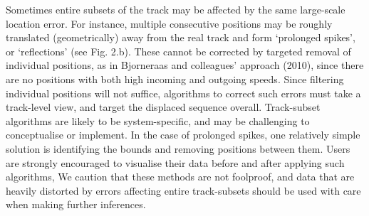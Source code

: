 \documentclass[10pt,paper=a4,headings=standardclasses
]{scrartcl}
\begin{document}
Sometimes entire subsets of the track may be affected by the same large-scale location error.
For instance, multiple consecutive positions may be roughly translated (geometrically) away from the real track and form `prolonged spikes', or `reflections' (see Fig. 2.b).
These cannot be corrected by targeted removal of individual positions, as in Bjorneraas and colleagues' approach (2010), since there are no positions with both high incoming and outgoing speeds.
Since filtering individual positions will not suffice, algorithms to correct such errors must take a track-level view, and target the displaced sequence overall.
Track-subset algorithms are likely to be system-specific, and may be challenging to conceptualise or implement.
In the case of prolonged spikes, one relatively simple solution is identifying the bounds and removing positions between them.
Users are strongly encouraged to visualise their data before and after applying such algorithms, 
We caution that these methods are not foolproof, and data that are heavily distorted by errors affecting entire track-subsets should be used with care when making further inferences.

\end{document}
